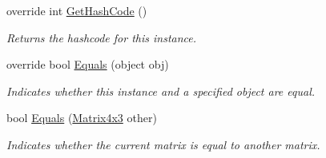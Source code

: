 \begin{DoxyCompactItemize}
override int \hyperlink{struct_open_t_k_1_1_matrix4x3_ad0b4eb3213d62e4f920b10931f94e9c1}{Get\-Hash\-Code} ()
\begin{DoxyCompactList}\small\item\em Returns the hashcode for this instance. \end{DoxyCompactList}\item 
override bool \hyperlink{struct_open_t_k_1_1_matrix4x3_a3b3e458f450f9c5fa340b3e8bf0a486c}{Equals} (object obj)
\begin{DoxyCompactList}\small\item\em Indicates whether this instance and a specified object are equal. \end{DoxyCompactList}\item 
bool \hyperlink{struct_open_t_k_1_1_matrix4x3_a456aa2c8523f503b18a63c2bf91a6fa3}{Equals} (\hyperlink{struct_open_t_k_1_1_matrix4x3}{Matrix4x3} other)
\begin{DoxyCompactList}\small\item\em Indicates whether the current matrix is equal to another matrix.\end{DoxyCompactList}\end{DoxyCompactItemize}
